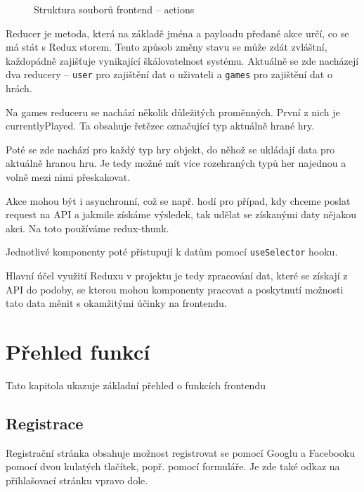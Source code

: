 \documentclass[a4paper,oneside,12pt]{report}
\begin{document}
\begin{figure}[H]
   \caption[Struktura souborů frontendu -- redux]{Struktura souborů frontend -- actions}
   \label{fig:frontendStructureSrc}
\end{figure}

Reducer je metoda, která na základě jména a payloadu předané akce určí, co se má stát s Redux storem.
Tento způsob změny stavu se může zdát zvláštní, každopádně zajišťuje vynikající škálovatelnost systému.
Aktuálně se zde nacházejí dva reducery -- \texttt{user} pro zajištění dat o uživateli a \texttt{games} pro zajištění dat o hrách. 

Na games reduceru se nachází několik důležitých proměnných. První z nich je currentlyPlayed. Ta obsahuje řetězec označující typ aktuálně hrané hry.

Poté se zde nachází pro každý typ hry objekt, do něhož se ukládají data pro aktuálně hranou hru. Je tedy možné mít více rozehraných typů her najednou a volně mezi nimi přeskakovat. 

Akce mohou být i asynchronní, což se např. hodí pro případ, kdy chceme poslat request na API a jakmile získáme výsledek, tak udělat se získanými daty nějakou akci. Na toto používáme redux-thunk.

Jednotlivé komponenty poté přistupují k datům pomocí \texttt{useSelector} hooku.

Hlavní účel využití Reduxu v projektu je tedy zpracování dat, které se získají z API do podoby, se kterou mohou komponenty pracovat a poskytnutí možnosti tato data měnit s okamžitými účinky na frontendu.

\section{Přehled funkcí}
Tato kapitola ukazuje základní přehled o funkcích frontendu

\subsection{Registrace}
Registrační stránka obsahuje možnost registrovat se pomocí Googlu a Facebooku pomocí dvou kulatých tlačítek, popř. pomocí formuláře. Je zde také odkaz na přihlašovací stránku vpravo dole.
\end{document}
